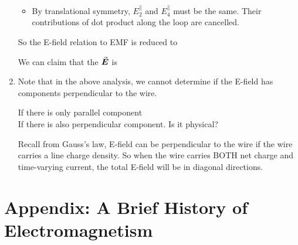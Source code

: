 \documentclass[class=article, crop=false, 12pt]{standalone}
\begin{document}
\begin{example}
\begin{enumerate}
\begin{itemize}
            
            \item By translational symmetry, 
            $E_2^\parallel$ and $E_4^\parallel$ must be the same. 
            Their contributions of dot product along the loop are cancelled.
        \end{itemize}
        
        So the E-field relation to EMF is reduced to
        
        We can claim that the $\va*{E}$  is

        \item Note that in the above analysis,
        we cannot determine if the E-field has components perpendicular to the wire.


        If there is only parallel component\\
        If there is also perpendicular component. Is it physical?

        
        Recall from Gauss's law, 
        E-field can be perpendicular to the wire if the wire carries a  line charge density.
        So when the wire carries BOTH net charge and time-varying current,
        the total E-field will be in diagonal directions.


    \end{enumerate}

    
\end{example}


\linesep

\appendix
\section*{Appendix: A Brief History of Electromagnetism}
\end{document}
